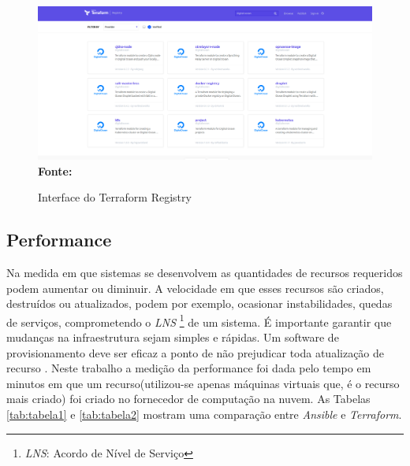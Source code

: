 \begin{figure}[H]
	\centering	
	\caption[\hspace{0.1cm} Interface do Terraform Registry]{Interface do Terraform Registry}
	\vspace{-0.4cm}
	\includegraphics[width=1.0\textwidth]{artigo/figuras/terraform_registy.png}
	 \vspace{-0.2cm}
	\\\textbf{\footnotesize Fonte: \cite{terraform_registry}}
	\label{fig:figura10}
\end{figure}
\vspace{-0.5cm}

\hfill


\subsection{Performance}
Na medida em que sistemas se desenvolvem as quantidades de recursos requeridos podem aumentar ou diminuir. A velocidade em que esses recursos são criados, destruídos ou atualizados, podem por exemplo, ocasionar instabilidades, quedas de serviços, comprometendo o \textit{LNS} \footnote{ \textit{LNS}: Acordo de Nível de Serviço} de um sistema. É importante garantir que mudanças na infraestrutura sejam simples e rápidas. Um software de provisionamento deve ser eficaz a ponto de não prejudicar toda atualização de recurso \cite{sre_google}. Neste trabalho a medição da performance foi dada pelo tempo em minutos em que um recurso(utilizou-se apenas máquinas virtuais que, é o recurso mais criado) foi criado no fornecedor de computação na nuvem. As Tabelas \ref{tab:tabela1} e \ref{tab:tabela2} mostram uma comparação entre \textit{Ansible} e \textit{Terraform}. 


